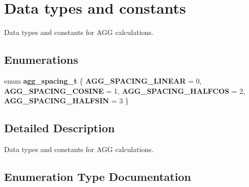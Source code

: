 \section{Data types and constants}
\label{group__types}


Data types and constants for A\+G\+G calculations.  


\subsection*{Enumerations}
\begin{DoxyCompactItemize}
\item 
enum {\bf agg\+\_\+spacing\+\_\+t} \{ {\bf A\+G\+G\+\_\+\+S\+P\+A\+C\+I\+N\+G\+\_\+\+L\+I\+N\+E\+A\+R} = 0, 
{\bf A\+G\+G\+\_\+\+S\+P\+A\+C\+I\+N\+G\+\_\+\+C\+O\+S\+I\+N\+E} = 1, 
{\bf A\+G\+G\+\_\+\+S\+P\+A\+C\+I\+N\+G\+\_\+\+H\+A\+L\+F\+C\+O\+S} = 2, 
{\bf A\+G\+G\+\_\+\+S\+P\+A\+C\+I\+N\+G\+\_\+\+H\+A\+L\+F\+S\+I\+N} = 3
 \}
\end{DoxyCompactItemize}


\subsection{Detailed Description}
Data types and constants for A\+G\+G calculations. 



\subsection{Enumeration Type Documentation}
